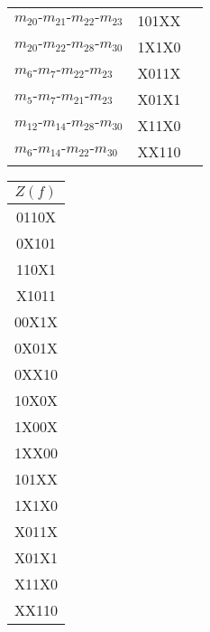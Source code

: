 \documentclass{article}
\begin{document}
\begin{center}
\begin{tabular}[t]{|lcc|}
$m_{20}\mbox{-}m_{21}\mbox{-}m_{22}\mbox{-}m_{23}$ & 101XX& \\$m_{20}\mbox{-}m_{22}\mbox{-}m_{28}\mbox{-}m_{30}$ & 1X1X0& \\$m_{6}\mbox{-}m_{7}\mbox{-}m_{22}\mbox{-}m_{23}$ & X011X& \\$m_{5}\mbox{-}m_{7}\mbox{-}m_{21}\mbox{-}m_{23}$ & X01X1& \\$m_{12}\mbox{-}m_{14}\mbox{-}m_{28}\mbox{-}m_{30}$ & X11X0& \\$m_{6}\mbox{-}m_{14}\mbox{-}m_{22}\mbox{-}m_{30}$ & XX110& \\\hline
\end{tabular}
\begin{tabular}[t]{|c|}
\hline $Z(f)$ \\ \hline
0110X\\
0X101\\
110X1\\
X1011\\
00X1X\\
0X01X\\
0XX10\\
10X0X\\
1X00X\\
1XX00\\
101XX\\
1X1X0\\
X011X\\
X01X1\\
X11X0\\
XX110\\
\hline \end{tabular}
\end{center}
\end{document}
